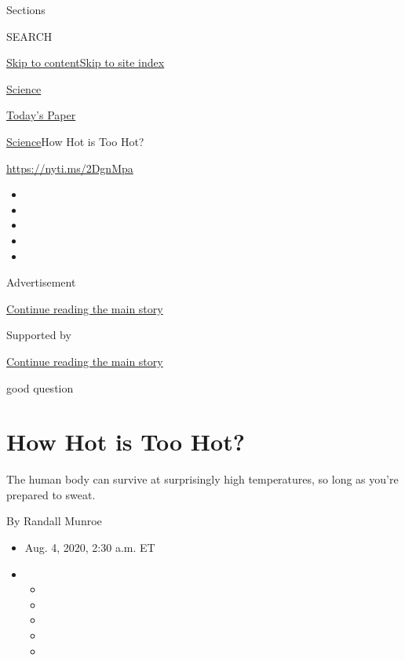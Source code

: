 Sections

SEARCH

\protect\hyperlink{site-content}{Skip to
content}\protect\hyperlink{site-index}{Skip to site index}

\href{https://www.nytimes3xbfgragh.onion/section/science}{Science}

\href{https://myaccount.nytimes3xbfgragh.onion/auth/login?response_type=cookie\&client_id=vi}{}

\href{https://www.nytimes3xbfgragh.onion/section/todayspaper}{Today's
Paper}

\href{/section/science}{Science}\textbar{}How Hot is Too Hot?

\url{https://nyti.ms/2DgnMpa}

\begin{itemize}
\item
\item
\item
\item
\item
\end{itemize}

Advertisement

\protect\hyperlink{after-top}{Continue reading the main story}

Supported by

\protect\hyperlink{after-sponsor}{Continue reading the main story}

good question

\hypertarget{how-hot-is-too-hot}{%
\section{How Hot is Too Hot?}\label{how-hot-is-too-hot}}

The human body can survive at surprisingly high temperatures, so long as
you're prepared to sweat.

By Randall Munroe

\begin{itemize}
\item
  Aug. 4, 2020, 2:30 a.m. ET
\item
  \begin{itemize}
  \item
  \item
  \item
  \item
  \item
  \end{itemize}
\end{itemize}

